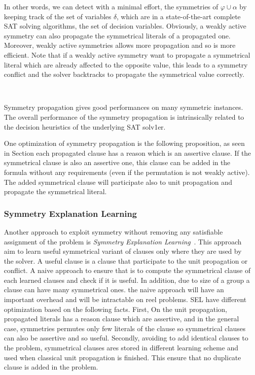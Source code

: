 
In other words, we can detect with a minimal effort, the symmetries of $\varphi
\cup \alpha$ by keeping track of the set of variables $\delta$, which are 
in a state-of-the-art complete SAT solving algorithms, the set of decision variables.
Obviously, a weakly active symmetry can also propagate the symmetrical literals of a propagated one.
Moreover, weakly active symmetries allows more propagation and so is more efficient.
Note that if a weakly active symmetry want to propagate a symmetrical literal which are already affected to the 
opposite value, this leads to a symmetry conflict and the solver backtracks to propagate the symmetrical value correctly.

\\

Symmetry propagation gives good performances on many symmetric instances.
The overall performance of the symmetry propagation is intrinsically related to the decision heuristics of
the underlying SAT solv1er.

One optimization of symmetry propagation is the following proposition, as seen in Section
 each propagated clause has a reason which is an assertive clause.
If the symmetrical clause is also an assertive one, this clause can be added in the formula without any requirements
(even if the permutation is not weakly active). The added symmetrical clause will participate also to unit propagation and propagate the symmetrical literal.


\subsubsection{Symmetry Explanation Learning}


Another approach to exploit symmetry without removing any satisfiable assignment of the problem
is \emph{Symmetry Explanation Learning}~\cite{devriendt2017symmetric}. This approach aim to learn useful 
symmetrical variant of clauses only where they are used by the solver. A useful clause is a clause that participate
to the unit propagation or conflict. 
A naive approach to ensure that is to compute the symmetrical clause of 
each learned clauses and check if it is useful. In addition, due to size of a group a clause can have many 
symmetrical ones. the naive approach will have an important overhead and will be intractable on reel problems.
SEL have different optimization based on the following facts. First,
On the unit propagation, propagated literals has a reason clause which are assertive, and in the general case,
 symmetries permutes only few literals of the clause so symmetrical clauses can also be assertive and so useful.
Secondly, avoiding to add identical clauses to the problem, symmetrical clauses ares stored in different learning scheme and used when classical unit propagation is finished. This ensure that no duplicate clause is added in the problem.
  

